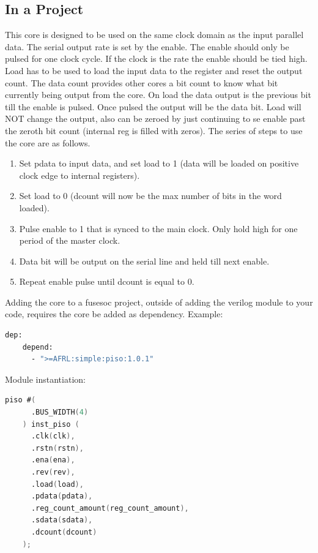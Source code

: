 \subsection{In a Project}
\par
This core is designed to be used on the same clock domain as the input parallel data. The serial output rate is set by the enable.
The enable should only be pulsed for one clock cycle. If the clock is the rate the enable should be tied high. Load has to be
used to load the input data to the register and reset the output count. The data count provides other cores a bit count to know
what bit currently being output from the core. On load the data output is the previous bit till the enable is pulsed.
Once pulsed the output will be the data bit. Load will NOT change the output, also can be zeroed by just continuing to
se enable past the zeroth bit count (internal reg is filled with zeros).
The series of steps to use the core are as follows.
\begin{enumerate}
  \item Set pdata to input data, and set load to 1 (data will be loaded on positive clock edge to internal registers).
  \item Set load to 0 (dcount will now be the max number of bits in the word loaded).
  \item Pulse enable to 1 that is synced to the main clock. Only hold high for one period of the master clock.
  \item Data bit will be output on the serial line and held till next enable.
  \item Repeat enable pulse until dcount is equal to 0.
\end{enumerate}

Adding the core to a fusesoc project, outside of adding the verilog module to your code, requires the core be added as dependency.
Example:
\begin{lstlisting}[language=bash]
  dep:
    depend:
      - ">=AFRL:simple:piso:1.0.1"
\end{lstlisting}

Module instantiation:
\begin{lstlisting}[language=Verilog]
    piso #(
      .BUS_WIDTH(4)
    ) inst_piso (
      .clk(clk),
      .rstn(rstn),
      .ena(ena),
      .rev(rev),
      .load(load),
      .pdata(pdata),
      .reg_count_amount(reg_count_amount),
      .sdata(sdata),
      .dcount(dcount)
    );
\end{lstlisting}

